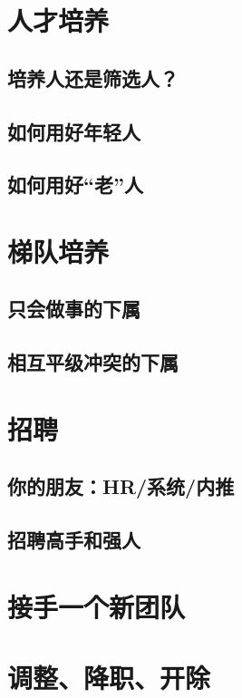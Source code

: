 
\section{人才培养}
\subsection{培养人还是筛选人？}
\subsection{如何用好年轻人}
\subsection{如何用好“老”人}

\section{梯队培养}
\subsection{只会做事的下属}
\subsection{相互平级冲突的下属}

\section{招聘}
\subsection{你的朋友：HR/系统/内推}
\subsection{招聘高手和强人} %

\section{接手一个新团队}

\section{调整、降职、开除}
